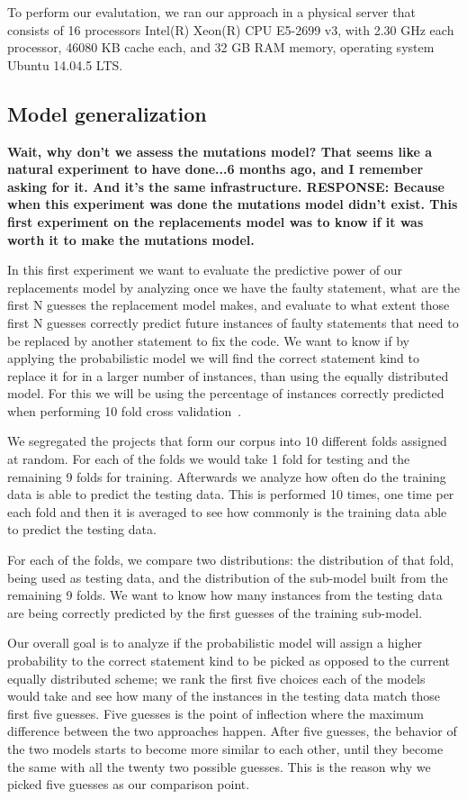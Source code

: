 \documentclass[conference]{IEEEtran}
\newcommand{\todo}[1]
  {{\scriptsize \textbf{\color{red} {#1}}}}
\begin{document}
To perform our evalutation, we ran our approach in a physical server that 
consists of 16 processors Intel(R) Xeon(R) CPU E5-2699 v3, with 2.30 GHz each
processor, 46080 KB cache each, and 32 GB RAM memory, operating system Ubuntu 
14.04.5 LTS.

\subsection{Model generalization}
\label{sec:generalize}

\todo{Wait, why don't we assess the mutations model?  That seems like a natural
  experiment to have done...6 months ago, and I remember asking for it.  And
  it's the same infrastructure. RESPONSE: Because when this experiment was done 
  the mutations model didn't exist. This first experiment on the replacements model 
  was to know if it was worth it to make the mutations model.}
  
In this first experiment we want to evaluate the predictive power of our 
replacements model by analyzing once we have the faulty statement, what are 
the first N guesses the replacement model makes, and evaluate to what extent 
those first N guesses correctly predict future instances of faulty statements 
that need to be replaced by another statement to fix the code. We want to know 
if by applying the probabilistic model we will find the correct statement kind 
to replace it for in a larger number of instances, than using the equally 
distributed model. For this we will be using the percentage of instances correctly 
predicted when performing 10 fold cross validation~\cite{kohavi95}.

We segregated the projects that form our corpus into 10 
different folds assigned at random. For each of the 
folds we would take 1 fold for testing and the remaining 9 folds for training. 
Afterwards we analyze how often do the training data is able to predict the 
testing data. This is performed 10 times, one time per each fold and then it is 
averaged to see how commonly is the training data able to predict the testing 
data.

For each of the folds, we compare two distributions: the distribution of that fold,
 being used as testing 
data, and the distribution of the sub-model built from the remaining 9 folds.
 We want to know how many instances from the testing data are being correctly 
 predicted by the first guesses of the training sub-model.   
  
Our overall goal is to analyze if the probabilistic model will assign a higher 
probability to the correct statement kind to be picked as opposed 
to the current equally distributed scheme; we rank the first five choices each 
of the models would take and see how many of the instances in the testing data 
match those first five guesses. Five guesses is the point of inflection where
the maximum difference between the two approaches happen. After five guesses, 
the behavior of the two models starts to become more similar to each other, 
until they become the same with all the twenty two possible guesses.
This is the reason why we picked five guesses as our
comparison point.
\end{document}
